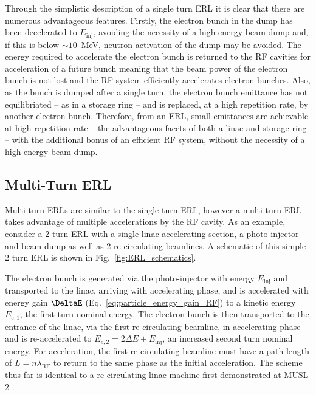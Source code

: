 \documentclass[../main.tex]{subfiles}
\begin{document}
Through the simplistic description of a single turn ERL it is clear that there are numerous advantageous features. Firstly, the electron bunch in the dump has been decelerated to $E_{\mathrm{inj}}$, avoiding the necessity of a high-energy beam dump and, if this is below $\sim10$~\si{\mega\electronvolt}, neutron activation of the dump may be avoided. The energy required to accelerate the electron bunch is returned to the RF cavities for acceleration of a future bunch meaning that the beam power of the electron bunch is not lost and the RF system efficiently accelerates electron bunches. Also, as the bunch is dumped after a single turn, the electron bunch emittance  has not equilibriated -- as in a storage ring \cite{owen2013nonequilibrium} -- and is replaced, at a high repetition rate, by another electron bunch. Therefore, from an ERL, small emittances are achievable at high repetition rate -- the advantageous facets of both a linac and storage ring -- with the additional bonus of an efficient RF system, without the necessity of a high energy beam dump. 

\subsection{Multi-Turn ERL}
\label{sec:multi_turn_ERL}

Multi-turn ERLs are similar to the single turn ERL, however a multi-turn ERL takes advantage of multiple accelerations by the RF cavity. As an example, consider a 2 turn ERL with a single linac accelerating section, a photo-injector and beam dump as well as 2 re-circulating beamlines. A schematic of this simple 2 turn ERL is shown in Fig.~\ref{fig:ERL_schematics}.  

The electron bunch is generated via the photo-injector with energy $E_{\mathrm{inj}}$ and transported to the linac, arriving with accelerating phase, and is accelerated with energy gain $\DeltaE$ (Eq.~\ref{eq:particle_energy_gain_RF}) to a kinetic energy $E_{e,1}$, the first turn nominal energy. The electron bunch is then transported to the entrance of the linac, via the first re-circulating beamline, in accelerating phase and is re-accelerated to $E_{e,2}=2\Delta E+E_{\mathrm{inj}}$, an increased second turn nominal energy. For acceleration, the first re-circulating beamline must have a path length of $L = n\lambda_{\mathrm{RF}}$ to return to the same phase as the initial acceleration. The scheme thus far is identical to a re-circulating linac machine first demonstrated at MUSL-2 \cite{axel1977status}.
\end{document}
